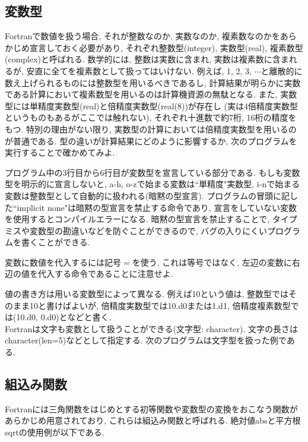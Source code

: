 \documentclass[a4j]{jsarticle}
\begin{document}
\subsection{変数型}
Fortranで数値を扱う場合, それが整数なのか, 実数なのか, 複素数なのかをあらかじめ宣言しておく必要があり, 
それぞれ整数型(integer), 実数型(real), 複素数型(complex)と呼ばれる. 
数学的には, 整数は実数に含まれ, 実数は複素数に含まれるが, 
安直に全てを複素数として扱ってはいけない. 
例えば, 1, 2, 3, $\cdots$と離散的に数え上げられるものには整数型を用いるべきであるし, 
計算結果が明らかに実数である計算において複素数型を用いるのは計算機資源の無駄となる. 
また, 実数型には単精度実数型(real)と倍精度実数型(real(8))が存在し
(実は4倍精度実数型というものもあるがここでは触れない), 
それぞれ十進数で約7桁, 16桁の精度をもつ. 
特別の理由がない限り, 実数型の計算においては倍精度実数型を用いるのが普通である. 
型の違いが計算結果にどのように影響するか, 次のプログラムを実行することで確かめてみよ. 

プログラム中の3行目から6行目が変数型を宣言している部分である. 
もしも変数型を明示的に宣言しないと, a-h, o-zで始まる変数は``単精度"実数型, 
i-nで始まる変数は整数型として自動的に扱われる(暗黙の型宣言). 
プログラムの冒頭に記した``implicit none"は暗黙の型宣言を禁止する命令であり, 
宣言をしていない変数を使用するとコンパイルエラーになる. 
暗黙の型宣言を禁止することで, タイプミスや変数型の勘違いなどを防ぐことができるので, 
バグの入りにくいプログラムを書くことができる. 

変数に数値を代入するには記号$=$を使う. 
これは等号ではなく, 左辺の変数に右辺の値を代入する命令であることに注意せよ. 

値の書き方は用いる変数型によって異なる. 
例えば10という値は, 整数型ではそのまま10と書けばよいが, 
倍精度実数型では10.d0または1.d1, 倍精度複素数型では(10.d0, 0.d0)となどと書く. \\


Fortranは文字も変数として扱うことができる(文字型: character). 
文字の長さはcharacter(len=5)などとして指定する. 
次のプログラムは文字型を扱った例である. 



\subsection{組込み関数}
Fortranには三角関数をはじめとする初等関数や変数型の変換をおこなう関数があらかじめ用意されており, 
これらは組込み関数と呼ばれる. 
絶対値absと平方根sqrtの使用例が以下である. 

\end{document}

